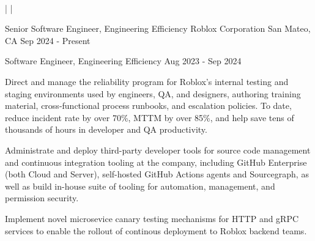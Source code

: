 \documentclass[]{awesome-cv}
\begin{document}
    
\begin{center}
	   \\

	{} | {} | {}
\end{center}

\vspace{-6mm}
\vspace{-2mm}

	

	\cventry
	{Senior Software Engineer, Engineering Efficiency}
	{Roblox Corporation}
	{San Mateo, CA}
	{Sep 2024 - Present}
	{}

	\vspace{-7mm}
	\cventry
	{Software Engineer, Engineering Efficiency}
	{}
	{}
	{Aug 2023 - Sep 2024}
	{\begin{cvitems}
		\item{Direct and manage the reliability program for Roblox's internal testing and staging environments used by engineers, QA, and designers, authoring training material, cross-functional process runbooks, and escalation policies. To date, reduce incident rate by over 70\%, MTTM by over 85\%, and help save tens of thousands of hours in developer and QA productivity.}
		\item{Administrate and deploy third-party developer tools for source code management and continuous integration tooling at the company, including GitHub Enterprise (both Cloud and Server), self-hosted GitHub Actions agents and Sourcegraph, as well as build in-house suite of tooling for automation, management, and permission security.}
		\item{Implement novel microsevice canary testing mechanisms for HTTP and gRPC services to enable the rollout of continous deployment to Roblox backend teams.}
	\end{cvitems}}
\end{document}
